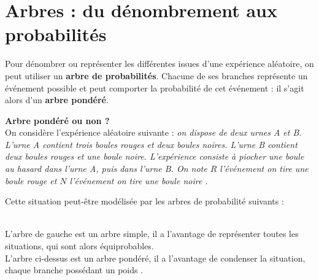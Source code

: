 \section{Arbres : du dénombrement aux probabilités} 

\begin{definition}
   Pour dénombrer ou représenter les différentes issues d'une expérience aléatoire, on peut utiliser un \textbf{arbre de probabilités}. Chacune de ses branches représente un événement possible et peut comporter la probabilité de cet événement : il s'agit alors d'un \textbf{arbre pondéré}.
\end{definition}

\bigskip

{\bf Arbre pondéré ou non ?} \\ 
On considère l'expérience aléatoire suivante : {\it on dispose de deux urnes  A et B. L'urne A contient trois boules rouges et deux boules noires. L'urne B contient deux boules rouges et une boule noire. L'expérience consiste à piocher une boule au hasard dans l'urne A, puis dans l'urne B. On note $R$ l'événement \og on tire une boule rouge \fg{} et $N$ l'événement \og on tire une boule noire \fg{}.}
  
   Cette situation peut-être modélisée par les arbres de probabilité suivants : \\

\begin{minipage}{7cm}
\end{minipage}
\begin{minipage}{9cm}
   \hspace*{1cm}
    \\ [1cm]
         
   L'arbre de gauche est un arbre simple, il a l'avantage de représenter toutes les situations, qui sont alors équiprobables. \\
   L'arbre ci-dessus est un arbre pondéré, il a l'avantage de condenser la situation, chaque branche possédant un \og poids \fg{}.           
\end{minipage}

